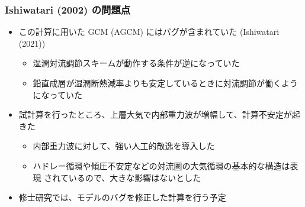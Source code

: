 \documentclass[aspectratio=149,9pt,]{beamer}
\begin{document}
\begin{frame}
	\frametitle{Ishiwatari \etal (2002) の問題点}
	\begin{itemize}
		\item この計算に用いた GCM (AGCM) にはバグが含まれていた (Ishiwatari \etal (2021))
			\begin{itemize}
				\item 湿潤対流調節スキームが動作する条件が逆になっていた
				\item 鉛直成層が湿潤断熱減率よりも安定しているときに対流調節が働くようになっていた
			\end{itemize}
		\item 試計算を行ったところ、上層大気で内部重力波が増幅して、計算不安定が起きた
			\begin{itemize}
				\item 内部重力波に対して、強い人工的散逸を導入した
				\item ハドレー循環や傾圧不安定などの対流圏の大気循環の基本的な構造は表現
					されているので、大きな影響はないとした
			\end{itemize}
		\item 修士研究では、モデルのバグを修正した計算を行う予定
	\end{itemize}
\end{frame}
\end{document}
